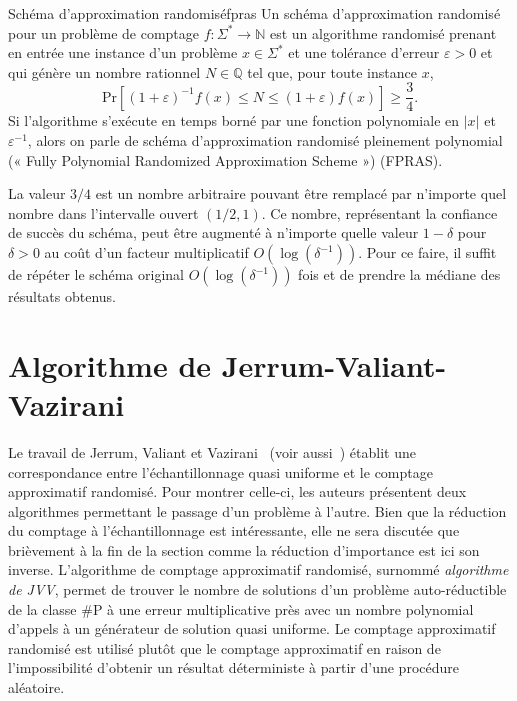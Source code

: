 \begin{maindefinition}{Schéma d'approximation randomisé}{fpras}
    Un schéma d'approximation randomisé pour un problème de comptage $f: \Sigma^{*} \to \mathbb{N}$ est un algorithme randomisé prenant en entrée une instance d'un problème $x \in \Sigma^{*}$ et une tolérance d'erreur $\varepsilon > 0$ et qui génère un nombre rationnel $N \in \mathbb{Q}$ tel que, pour toute instance $x$,
    \begin{equation*}
        \mathrm{ Pr }\left[(1+\varepsilon)^{-1} f(x) \leq N \leq (1+\varepsilon)f(x)\right] \geq \frac{3}{4} .
    \end{equation*}
    Si l'algorithme s'exécute en temps borné par une fonction polynomiale en $\lvert x \rvert$ et $\varepsilon^{-1}$, alors on parle de schéma d'approximation randomisé pleinement polynomial (« Fully Polynomial Randomized Approximation Scheme ») (FPRAS).
\end{maindefinition}

La valeur $3/4$ est un nombre arbitraire pouvant être remplacé par n'importe quel nombre dans l'intervalle ouvert $(1/2, 1)$. Ce nombre, représentant la confiance de succès du schéma, peut être augmenté à n'importe quelle valeur $1-\delta$ pour $\delta > 0$ au coût d'un facteur multiplicatif $O(\log(\delta^{-1}))$. Pour ce faire, il suffit de répéter le schéma original $O(\log(\delta^{-1}))$ fois et de prendre la médiane des résultats obtenus.   


\section{Algorithme de Jerrum-Valiant-Vazirani}
\label{sec:algorithme-jvv}

Le travail de Jerrum, Valiant et Vazirani~\cite{jerrumRandomGenerationCombinatorial1986} (voir aussi~\cite{broderHowHardIt1986, sinclairAlgorithmsRandomGeneration1993}) établit une correspondance entre l'échantillonnage quasi uniforme et le comptage approximatif randomisé. Pour montrer celle-ci, les auteurs présentent deux algorithmes permettant le passage d'un problème à l'autre. Bien que la réduction du comptage à l'échantillonnage est intéressante, elle ne sera discutée que brièvement à la fin de la section comme la réduction d'importance est ici son inverse. L'algorithme de comptage approximatif randomisé, surnommé \textit{algorithme de JVV}, permet de trouver le nombre de solutions d'un problème auto-réductible de la classe \textsf{\#P} à une erreur multiplicative près avec un nombre polynomial d'appels à un générateur de solution quasi uniforme. Le comptage approximatif randomisé est utilisé plutôt que le comptage approximatif en raison de l'impossibilité d'obtenir un résultat déterministe à partir d'une procédure aléatoire.

